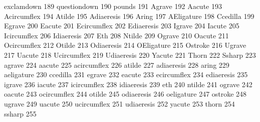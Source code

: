  exclamdown      189 %
 questiondown    190 %
 pounds          191
 Agrave          192
 Aacute          193
 Acircumflex     194
 Atilde          195
 Adiaeresis      196
 Aring           197
 AEligature      198
 Ccedilla        199
 Egrave          200
 Eacute          201
 Ecircumflex     202
 Ediaeresis      203
 Igrave          204
 Iacute          205
 Icircumflex     206
 Idiaeresis      207
 Eth             208
 Ntilde          209
 Ograve          210
 Oacute          211
 Ocircumflex     212
 Otilde          213
 Odiaeresis      214
 OEligature      215
 Ostroke         216
 Ugrave          217
 Uacute          218
 Ucircumflex     219
 Udiaeresis      220
 Yacute          221
 Thorn           222
 Ssharp          223  
 agrave          224
 aacute          225
 acircumflex     226
 atilde          227
 adiaeresis      228
 aring           229
 aeligature      230
 ccedilla        231
 egrave          232
 eacute          233
 ecircumflex     234
 ediaeresis      235
 igrave          236
 iacute          237
 icircumflex     238
 idiaeresis      239
 eth             240
 ntilde          241
 ograve          242
 oacute          243
 ocircumflex     244
 otilde          245
 odiaeresis      246
 oeligature      247
 ostroke         248
 ugrave          249
 uacute          250
 ucircumflex     251
 udiaeresis      252
 yacute          253
 thorn           254 
 ssharp          255  

\stopencoding

\endinput
